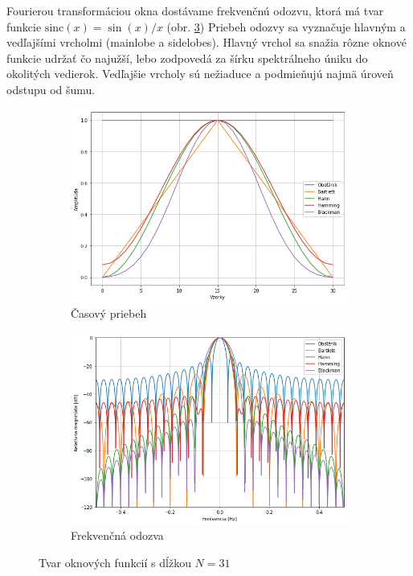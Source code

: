 Fourierou transformáciou okna dostávame frekvenčnú odozvu, ktorá má tvar funkcie $\mathrm{sinc}(x) = \sin(x) / x$
(obr. \ref{fig:window-freq}) Priebeh odozvy sa vyznačuje hlavným a vedľajšími vrcholmi (mainlobe a sidelobes).
Hlavný vrchol sa snažia
rôzne oknové funkcie udržať čo najužší, lebo zodpovedá za šírku spektrálneho úniku do okolitých vedierok.
Vedľajšie vrcholy sú nežiaduce a podmieňujú najmä úroveň odstupu od šumu.

\begin{figure}[h]
\centering
\begin{subfigure}[b]{0.48\textwidth}
    \centering
    \includegraphics[width=\textwidth]{figures/analysis/window-time.png}
    \caption{Časový priebeh}
    \label{fig:window-time}
\end{subfigure}
\hfill
\begin{subfigure}[b]{0.48\textwidth}
    \centering
    \includegraphics[width=\textwidth]{figures/analysis/window-freq.png}
    \caption{Frekvenčná odozva}
    \label{fig:window-freq}
\end{subfigure}
\caption{Tvar oknových funkcií s dĺžkou $N = 31$}
\end{figure}

